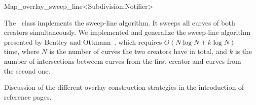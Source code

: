 
\ccRefPageBegin


\renewcommand{\ccRefPageBegin}{\begin{ccAdvanced}}
\renewcommand{\ccRefPageEnd}{\end{ccAdvanced}}

\begin{ccRefClass}{Map_overlay_sweep_line<Subdivision,Notifier>}
\label{OVL_sec:sweep_line}

The \ccRefName\ class implements the sweep-line algorithm.
It sweeps all curves of both creators simultaneously. 
We implemented and generalize the sweep-line algorithm presented by 
Bentley and Ottmann~\cite{bkos-cgaa-97}, which requires 
$O(N\log{N} + k\log{N})$ time, where $N$ is the number of curves the two 
creators have in total, and $k$ is the number of intersections betweem curves 
from the first creator and curves from the second one.


\ccIsModel

\ccInheritsFrom

\ccSeeAlso
   Discussion of the different overlay construction strategies in the introduction
of  reference pages.

\end{ccRefClass}
\renewcommand{\ccRefPageBegin}{}
\renewcommand{\ccRefPageEnd}{}


\ccRefPageEnd
